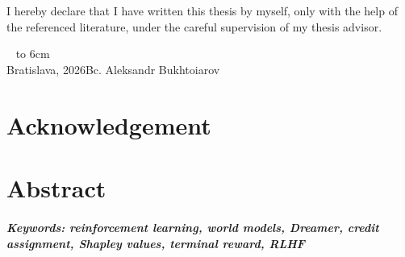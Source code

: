 \documentclass[12pt, twoside, openany]{book}
\def\mfrok{2026}
\def\mfauthor{Bc. Aleksandr Bukhtoiarov}
\def\mfplacedate{Bratislava, \mfrok}
\begin{document}
{~}\vspace{12cm}

\noindent
\begin{minipage}{0.25\textwidth}~\end{minipage}
\thispagestyle{empty}
\begin{minipage}{0.75\textwidth}
I hereby declare that I have written this thesis by myself, only with the help of the referenced literature, under the careful supervision of my thesis advisor.
\newline \newline
\end{minipage}
\vfill
~ \hfill {\hbox to 6cm{\dotfill}} \\
\mfplacedate \hfill \mfauthor
\vfill\eject \cleardoublepage

\newpage
\thispagestyle{empty}
\chapter*{Acknowledgement}\label{chap:thank_you}

\vfill\eject



\newpage
\thispagestyle{empty}
\chapter*{Abstract}\label{chap:abstract_en}

\paragraph*{Keywords: reinforcement learning, world models, Dreamer, credit assignment, Shapley values, terminal reward, RLHF}

\newpage
\tableofcontents

\newpage
\listoffigures
\listoftables



\mainmatter








\backmatter

\nocite{*}


\end{document}
